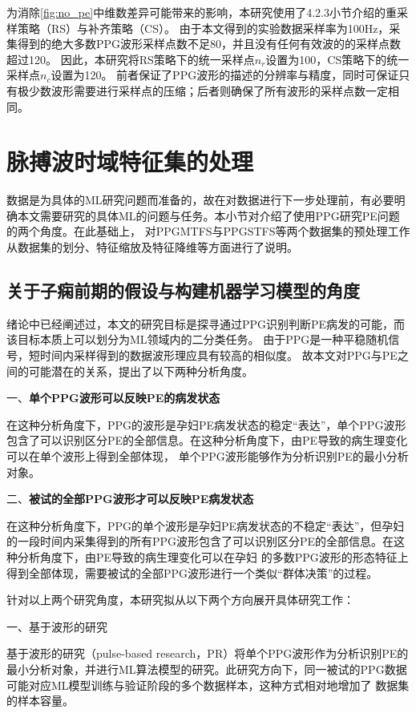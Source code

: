 为消除\autoref{fig:no_pe}中维数差异可能带来的影响，本研究使用了4.2.3小节介绍的重采样策略（RS）与补齐策略（CS）。
由于本文得到的实验数据采样率为100Hz，采集得到的绝大多数PPG波形采样点数不足80，并且没有任何有效波的的采样点数超过120。
因此，本研究将RS策略下的统一采样点$n_r$设置为100，CS策略下的统一采样点$n_c$设置为120。
前者保证了PPG波形的描述的分辨率与精度，同时可保证只有极少数波形需要进行采样点的压缩；后者则确保了所有波形的采样点数一定相同。

\section{脉搏波时域特征集的处理}
数据是为具体的ML研究问题而准备的，故在对数据进行下一步处理前，有必要明确本文需要研究的具体ML的问题与任务。本小节对介绍了使用PPG研究PE问题的两个角度。在此基础上，
对PPGMTFS与PPGSTFS等两个数据集的预处理工作从数据集的划分、特征缩放及特征降维等方面进行了说明。

\subsection{关于子痫前期的假设与构建机器学习模型的角度}
绪论中已经阐述过，本文的研究目标是探寻通过PPG识别判断PE病发的可能，而该目标本质上可以划分为ML领域内的二分类任务。
由于PPG是一种平稳随机信号，短时间内采样得到的数据波形理应具有较高的相似度\cite{Qiu2012,PPGYY,Ma2015}。
故本文对PPG与PE之间的可能潜在的关系，提出了以下两种分析角度。

一、\textbf{单个PPG波形可以反映PE的病发状态}

在这种分析角度下，PPG的波形是孕妇PE病发状态的稳定“表达”，单个PPG波形包含了可以识别区分PE的全部信息。在这种分析角度下，由PE导致的病生理变化可以在单个波形上得到全部体现，
单个PPG波形能够作为分析识别PE的最小分析对象。

二、\textbf{被试的全部PPG波形才可以反映PE病发状态}

在这种分析角度下，PPG的单个波形是孕妇PE病发状态的不稳定“表达”，但孕妇的一段时间内采集得到的所有PPG波形包含了可以识别区分PE的全部信息。在这种分析角度下，由PE导致的病生理变化可以在孕妇
的多数PPG波形的形态特征上得到全部体现，需要被试的全部PPG波形进行一个类似“群体决策”的过程。

针对以上两个研究角度，本研究拟从以下两个方向展开具体研究工作：

一、基于波形的研究

基于波形的研究（pulse-based research，PR）将单个PPG波形作为分析识别PE的最小分析对象，并进行ML算法模型的研究。此研究方向下，同一被试的PPG数据可能对应ML模型训练与验证阶段的多个数据样本，这种方式相对地增加了
数据集的样本容量。

